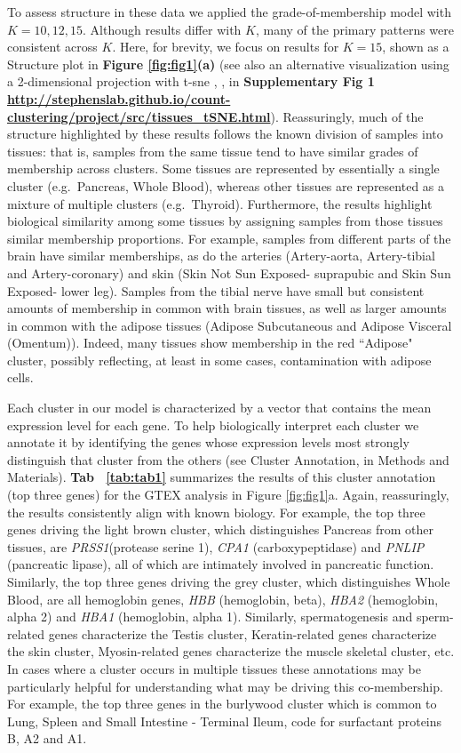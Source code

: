 To assess structure in these data we applied the grade-of-membership model with $K=10,12,15$. Although results differ with $K$, many of the primary patterns were consistent across $K$. Here, for brevity, we focus on results for $K=15$, shown as a Structure plot in \textbf{Figure \ref{fig:fig1}(a)} (see also an alternative visualization using a 2-dimensional projection with t-sne \cite{Maaten2008}, \cite{Maaten2014}, in \textbf{Supplementary Fig 1 \url{http://stephenslab.github.io/count-clustering/project/src/tissues_tSNE.html}}). Reassuringly, much of the structure highlighted by these results follows the known division of samples into tissues: that is, samples from the same tissue tend to have similar grades of membership across clusters. Some tissues are represented by essentially a single cluster (e.g.~Pancreas, Whole Blood), whereas other tissues are represented as a mixture of multiple clusters (e.g.~Thyroid). Furthermore, the results highlight biological similarity among some tissues by assigning samples from those tissues similar membership proportions. For example, samples from different parts of the brain have similar memberships, as do the arteries (Artery-aorta, Artery-tibial and Artery-coronary) and skin (Skin Not Sun Exposed- suprapubic and Skin Sun Exposed- lower leg). Samples from the tibial nerve have small but consistent amounts of membership in common with brain tissues, as well as larger amounts in common with the adipose tissues (Adipose Subcutaneous and Adipose Visceral (Omentum)). Indeed, many 
tissues show membership in the red ``Adipose" cluster, possibly reflecting, at least in some cases, contamination with adipose cells.
 
Each cluster in our model is characterized by a vector that contains the mean expression level for each gene. To help biologically interpret each cluster we annotate it by identifying the genes whose expression levels most strongly distinguish that cluster from the others (see Cluster Annotation, in Methods and Materials).  \textbf{Tab ~\ref{tab:tab1}} summarizes the results of this cluster annotation (top three genes) for the GTEX analysis in Figure \ref{fig:fig1}a.  Again, reassuringly, the results consistently align with known biology. For example,  the top three genes driving the light brown cluster, which distinguishes Pancreas from other tissues, are  \textit{PRSS1}(protease serine 1), \textit{CPA1} (carboxypeptidase) and \textit{PNLIP} (pancreatic lipase), all of which are intimately involved in pancreatic function. Similarly, the top three genes driving the grey cluster, which distinguishes Whole Blood, are all hemoglobin genes, \textit{HBB} (hemoglobin, beta), \textit{HBA2} (hemoglobin, alpha 2) and \textit{HBA1} (hemoglobin, alpha 1).  Similarly, spermatogenesis and sperm-related genes characterize the Testis cluster, Keratin-related genes characterize the skin cluster, Myosin-related genes characterize the muscle skeletal cluster, etc. In cases where a cluster occurs in multiple tissues these annotations may be particularly helpful for understanding what may be driving this co-membership. For example, the top three genes in the  burlywood cluster  which is common to Lung, Spleen and Small Intestine - Terminal Ileum, code for surfactant proteins B, A2 and A1.


